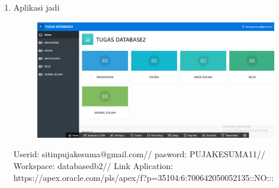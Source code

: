\begin{enumerate}
	\item Aplikasi jadi   
	\begin{figure} [!htbp]
	\includegraphics[scale=0.2]{Apex/32.png}
	\centering
	\end{figure}
	
Userid: sitinpujakesuma@gmail.com//
pasword: PUJAKESUMA11//
Workspace: databasedb2//
Link Aplication: https://apex.oracle.com/pls/apex/f?p=35104:6:700642050052135::NO:::
	
\end{enumerate}
